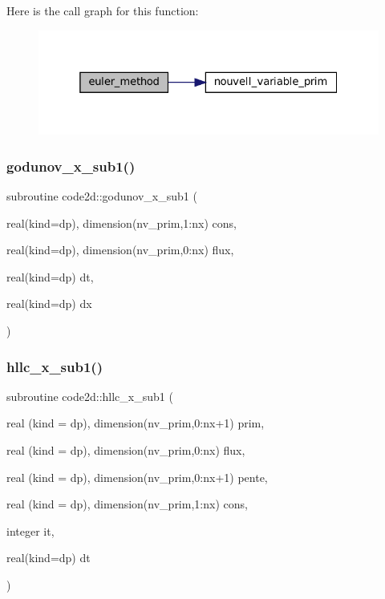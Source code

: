 Here is the call graph for this function\+:
\nopagebreak
\begin{figure}[H]
\begin{center}
\leavevmode
\includegraphics[width=325pt]{main1DOr2_8f90_a61ef0ae28fb906748d601350a093a3fa_cgraph}
\end{center}
\end{figure}
\mbox{\label{main1DOr2_8f90_aec66a1d113ade1d60ad864482ea8e4cf}} 
\subsubsection{\texorpdfstring{godunov\+\_\+x\+\_\+sub1()}{godunov\_x\_sub1()}}
{\footnotesize\ttfamily subroutine code2d\+::godunov\+\_\+x\+\_\+sub1 (\begin{DoxyParamCaption}\item[{real(kind=dp), dimension(nv\+\_\+prim,1\+:nx)}]{cons,  }\item[{real(kind=dp), dimension(nv\+\_\+prim,0\+:nx)}]{flux,  }\item[{real(kind=dp)}]{dt,  }\item[{real(kind=dp)}]{dx }\end{DoxyParamCaption})}

\mbox{\label{main1DOr2_8f90_a86edd837bdc9a015ebd8a46212fe70ab}} 
\subsubsection{\texorpdfstring{hllc\+\_\+x\+\_\+sub1()}{hllc\_x\_sub1()}}
{\footnotesize\ttfamily subroutine code2d\+::hllc\+\_\+x\+\_\+sub1 (\begin{DoxyParamCaption}\item[{real (kind = dp), dimension(nv\+\_\+prim,0\+:nx+1)}]{prim,  }\item[{real (kind = dp), dimension(nv\+\_\+prim,0\+:nx)}]{flux,  }\item[{real (kind = dp), dimension(nv\+\_\+prim,0\+:nx+1)}]{pente,  }\item[{real (kind = dp), dimension(nv\+\_\+prim,1\+:nx)}]{cons,  }\item[{integer}]{it,  }\item[{real(kind=dp)}]{dt }\end{DoxyParamCaption})}

